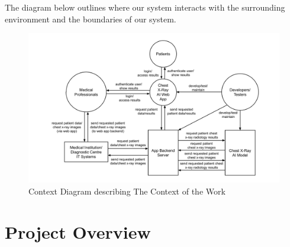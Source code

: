 \documentclass[12pt, titlepage]{article}
\begin{document}
The diagram below outlines where our system interacts with the surrounding environment and the boundaries of our system. 
\begin{figure}[H]
    \centering
    \includegraphics[scale=0.25]{Context Diagram for Chest X-Ray AI Read.png}
    \caption{Context Diagram describing The Context of the Work}
    \label{fig:contextDiagram}
\end{figure}

\section{Project Overview}
\end{document}
